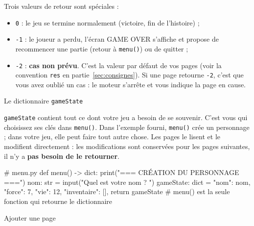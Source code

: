 \documentclass[11pt,a4paper]{article}
\makeatletter
\renewcommand\section{\@startsection{section}{1}{0pt}{1.6em}{0.8em}%
  {\Large\bfseries\color{nuit}}}
\makeatother
\begin{document}
Trois valeurs de retour sont spéciales :
\begin{itemize}
  \item \texttt{0} : le jeu se termine normalement (victoire, fin de l'histoire) ;
  \item \texttt{-1} : le joueur a perdu, l'écran GAME OVER s'affiche et propose de
        recommencer une partie (retour à \texttt{menu()}) ou de quitter ;
  \item \texttt{-2} : \textbf{cas non prévu}. C'est la valeur par défaut de vos pages
        (voir la convention \texttt{res} en partie~\ref{sec:consignes}). Si une page
        retourne \texttt{-2}, c'est que vous avez oublié un cas : le moteur s'arrête et
        vous indique la page en cause.
\end{itemize}

\section{Le dictionnaire \texttt{gameState}}

\texttt{gameState} contient tout ce dont votre jeu a besoin de se souvenir. C'est vous qui
choisissez ses clés dans \texttt{menu()}. Dans l'exemple fourni, \texttt{menu()} crée un
personnage ; dans votre jeu, elle peut faire tout autre chose. Les pages le lisent et le modifient directement :
les modifications sont conservées pour les pages suivantes, il n'y a \textbf{pas besoin de
le retourner}.

\begin{code}
# menu.py
def menu() -> dict:
    print("=== CRÉATION DU PERSONNAGE ===")
    nom: str = input("Quel est votre nom ? ")
    gameState: dict = {
        "nom": nom,
        "force": 7,
        "vie": 12,
        "inventaire": [],
    }
    return gameState      # menu() est la seule fonction qui retourne le dictionnaire
\end{code}

\section{Ajouter une page}
\end{document}
